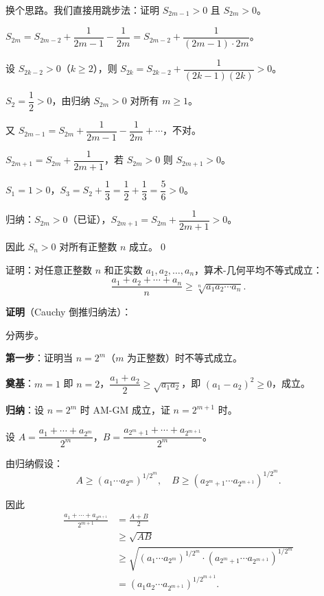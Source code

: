 \documentclass[12pt, a4paper]{ctexart}
\begin{document}
换个思路。我们直接用跳步法：证明 $S_{2m-1} > 0$ 且 $S_{2m} > 0$。

$S_{2m} = S_{2m-2} + \dfrac{1}{2m-1} - \dfrac{1}{2m} = S_{2m-2} + \dfrac{1}{(2m-1) \cdot 2m}$。

设 $S_{2k-2} > 0$（$k \geq 2$），则 $S_{2k} = S_{2k-2} + \dfrac{1}{(2k-1)(2k)} > 0$。

$S_2 = \dfrac{1}{2} > 0$，由归纳 $S_{2m} > 0$ 对所有 $m \geq 1$。

又 $S_{2m-1} = S_{2m} + \dfrac{1}{2m-1} - \dfrac{1}{2m} + \cdots$，不对。

$S_{2m+1} = S_{2m} + \dfrac{1}{2m+1}$，若 $S_{2m} > 0$ 则 $S_{2m+1} > 0$。

$S_1 = 1 > 0$，$S_3 = S_2 + \dfrac{1}{3} = \dfrac{1}{2} + \dfrac{1}{3} = \dfrac{5}{6} > 0$。

归纳：$S_{2m} > 0$（已证），$S_{2m+1} = S_{2m} + \dfrac{1}{2m+1} > 0$。

因此 $S_n > 0$ 对所有正整数 $n$ 成立。\qed

\begin{examplebox}
证明：对任意正整数 $n$ 和正实数 $a_1, a_2, \ldots, a_n$，算术-几何平均不等式成立：
\[ \frac{a_1 + a_2 + \cdots + a_n}{n} \geq \sqrt[n]{a_1 a_2 \cdots a_n}. \]
\end{examplebox}

\textbf{证明}（Cauchy 倒推归纳法）：

分两步。

\textbf{第一步}：证明当 $n = 2^m$（$m$ 为正整数）时不等式成立。

\textbf{奠基}：$m=1$ 即 $n=2$，$\dfrac{a_1 + a_2}{2} \geq \sqrt{a_1 a_2}$，即 $(a_1 - a_2)^2 \geq 0$，成立。

\textbf{归纳}：设 $n = 2^m$ 时 AM-GM 成立，证 $n = 2^{m+1}$ 时。

设 $A = \dfrac{a_1 + \cdots + a_{2^m}}{2^m}$，$B = \dfrac{a_{2^m+1} + \cdots + a_{2^{m+1}}}{2^m}$。

由归纳假设：
\[ A \geq (a_1 \cdots a_{2^m})^{1/2^m}, \quad B \geq (a_{2^m+1} \cdots a_{2^{m+1}})^{1/2^m}. \]

因此
\begin{align*}
\frac{a_1 + \cdots + a_{2^{m+1}}}{2^{m+1}} &= \frac{A + B}{2} \\
&\geq \sqrt{AB} \\
&\geq \sqrt{(a_1 \cdots a_{2^m})^{1/2^m} \cdot (a_{2^m+1} \cdots a_{2^{m+1}})^{1/2^m}} \\
&= (a_1 a_2 \cdots a_{2^{m+1}})^{1/2^{m+1}}.
\end{align*}
\end{document}
